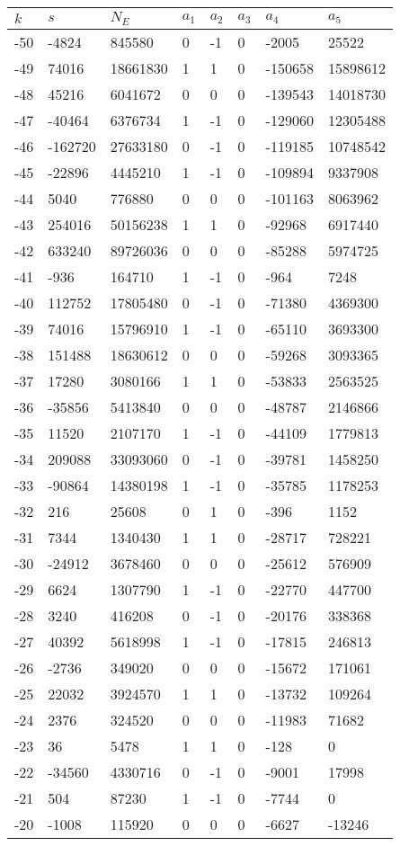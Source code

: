 \documentclass{amsart}
\begin{document}
\begin{longtable}{|l|l|l|lllll|}
\hline
$k$ & $s$ & $N_E$ & $a_1$ & $a_2$ & $a_3$ & $a_4$ & $a_5$\\
\hline
-50&-4824&845580&0&-1&0&-2005&25522\\
-49&74016&18661830&1&1&0&-150658&15898612\\
-48&45216&6041672&0&0&0&-139543&14018730\\
-47&-40464&6376734&1&-1&0&-129060&12305488\\
-46&-162720&27633180&0&-1&0&-119185&10748542\\
-45&-22896&4445210&1&-1&0&-109894&9337908\\
-44&5040&776880&0&0&0&-101163&8063962\\
-43&254016&50156238&1&1&0&-92968&6917440\\
-42&633240&89726036&0&0&0&-85288&5974725\\
-41&-936&164710&1&-1&0&-964&7248\\
-40&112752&17805480&0&-1&0&-71380&4369300\\
-39&74016&15796910&1&-1&0&-65110&3693300\\
-38&151488&18630612&0&0&0&-59268&3093365\\
-37&17280&3080166&1&1&0&-53833&2563525\\
-36&-35856&5413840&0&0&0&-48787&2146866\\
-35&11520&2107170&1&-1&0&-44109&1779813\\
-34&209088&33093060&0&-1&0&-39781&1458250\\
-33&-90864&14380198&1&-1&0&-35785&1178253\\
-32&216&25608&0&1&0&-396&1152\\
-31&7344&1340430&1&1&0&-28717&728221\\
-30&-24912&3678460&0&0&0&-25612&576909\\
-29&6624&1307790&1&-1&0&-22770&447700\\
-28&3240&416208&0&-1&0&-20176&338368\\
-27&40392&5618998&1&-1&0&-17815&246813\\
-26&-2736&349020&0&0&0&-15672&171061\\
-25&22032&3924570&1&1&0&-13732&109264\\
-24&2376&324520&0&0&0&-11983&71682\\
-23&36&5478&1&1&0&-128&0\\
-22&-34560&4330716&0&-1&0&-9001&17998\\
-21&504&87230&1&-1&0&-7744&0\\
-20&-1008&115920&0&0&0&-6627&-13246\\

\end{longtable}
\end{document}
